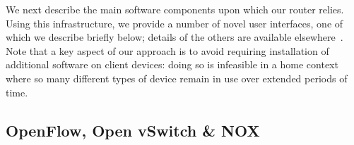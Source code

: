 
                                                                     

 We next describe the main software components upon which our router relies.
  Using this infrastructure, we provide a number of novel user interfaces, one
  of which we describe briefly below; details of the others are available
  elsewhere~\cite{mortier11:_suppor_novel_home_networ_manag}.  Note that a key
  aspect of our approach is to avoid requiring installation of additional
  software on client devices: doing so is infeasible in a home context where so
  many different types of device remain in use over extended periods of time.


\subsection{OpenFlow, Open vSwitch \& NOX} \label{s:openflow}

 

